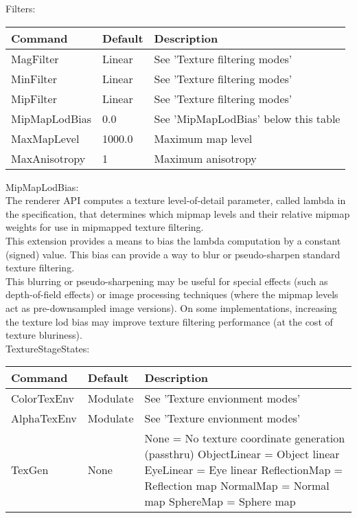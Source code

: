 Filters:\\
\begin{tabular}{|p{2.5cm}|p{2.5cm}|p{9cm}|}
\hline
\textbf{Command} & \textbf{Default} & \textbf{Description}\\
\hline
MagFilter     & Linear & See 'Texture filtering modes'\\
\hline
MinFilter     & Linear & See 'Texture filtering modes'\\
\hline
MipFilter     & Linear & See 'Texture filtering modes'\\
\hline
MipMapLodBias & 0.0    & See 'MipMapLodBias' below this table\\
\hline
MaxMapLevel   & 1000.0 & Maximum map level\\
\hline
MaxAnisotropy & 1      & Maximum anisotropy\\
\hline
\end{tabular}


MipMapLodBias:\\
The renderer \ac{API} computes a texture level-of-detail parameter, called lambda
in the specification, that determines which mipmap levels and
their relative mipmap weights for use in mipmapped texture filtering.\\

This extension provides a means to bias the lambda computation
by a constant (signed) value.  This bias can provide a way to blur
or pseudo-sharpen standard texture filtering.\\

This blurring or pseudo-sharpening may be useful for special effects
(such as depth-of-field effects) or image processing techniques
(where the mipmap levels act as pre-downsampled image versions).
On some implementations, increasing the texture lod bias may improve
texture filtering performance (at the cost of texture bluriness).\\


TextureStageStates:\\
\begin{tabular}{|p{2.5cm}|p{2.5cm}|p{9cm}|}
\hline
\textbf{Command} & \textbf{Default} & \textbf{Description}\\
\hline
ColorTexEnv & Modulate & See 'Texture envionment modes'\\
\hline
AlphaTexEnv & Modulate & See 'Texture envionment modes'\\
\hline
TexGen      & None     & None          = No texture coordinate generation (passthru)\newline
                         ObjectLinear  = Object linear\newline
                         EyeLinear     = Eye linear\newline
                         ReflectionMap = Reflection map\newline
                         NormalMap     = Normal map\newline
                         SphereMap     = Sphere map\newline\\
\hline
\end{tabular}



